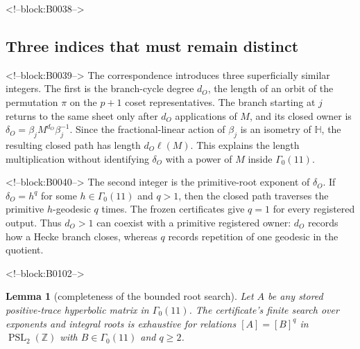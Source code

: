 \documentclass[11pt]{article}
\newtheorem{lemma}[theorem]{Lemma}
\theoremstyle{definition}
\theoremstyle{remark}
\newcommand{\G}{\Gamma_0(11)}
\newcommand{\HH}{\mathbb H}
\begin{document}
<!--block:B0038-->
\subsection{Three indices that must remain distinct}

<!--block:B0039-->
The correspondence introduces three superficially similar integers. The first is the branch-cycle degree $d_O$, the length of an orbit of the permutation $\pi$ on the $p+1$ coset representatives. The branch starting at $j$ returns to the same sheet only after $d_O$ applications of $M$, and its closed owner is $\delta_O=\beta_jM^{d_O}\beta_j^{-1}$. Since the fractional-linear action of $\beta_j$ is an isometry of $\HH$, the resulting closed path has length $d_O\ell(M)$. This explains the length multiplication without identifying $\delta_O$ with a power of $M$ inside $\G$.

<!--block:B0040-->
The second integer is the primitive-root exponent of $\delta_O$. If $\delta_O=h^q$ for some $h\in\G$ and $q>1$, then the closed path traverses the primitive $h$-geodesic $q$ times. The frozen certificates give $q=1$ for every registered output. Thus $d_O>1$ can coexist with a primitive registered owner: $d_O$ records how a Hecke branch closes, whereas $q$ records repetition of one geodesic in the quotient.

<!--block:B0102-->
\begin{lemma}[completeness of the bounded root search]\label{lem:root-completeness}
Let $A$ be any stored positive-trace hyperbolic matrix in $\G$. The certificate's finite search over exponents and integral roots is exhaustive for relations $[A]=[B]^q$ in $\operatorname{PSL}_2(\mathbb Z)$ with $B\in\G$ and $q\geq2$.
\end{lemma}
\end{document}
